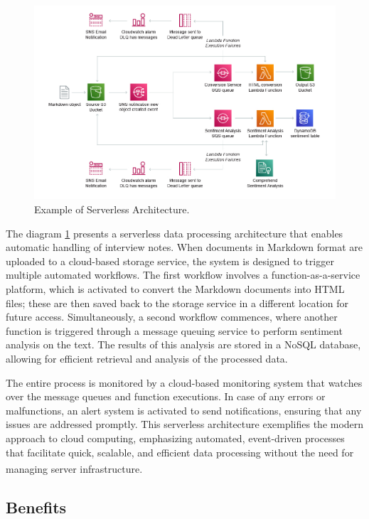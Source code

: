 \begin{figure}
    \centering
    \includegraphics[scale=0.4]{Pictures/3_serverless_example_2.jpg}
    \caption{Example of Serverless Architecture.}
    \label{fig:3_serverless_example}
\end{figure}

The diagram \ref{fig:3_serverless_example} presents a serverless data processing architecture that
enables automatic handling of interview notes. When documents in Markdown format are uploaded to a
cloud-based storage service, the system is designed to trigger multiple automated workflows. The
first workflow involves a function-as-a-service platform, which is activated to convert the Markdown
documents into HTML files; these are then saved back to the storage service in a different location
for future access. Simultaneously, a second workflow commences, where another function is triggered
through a message queuing service to perform sentiment analysis on the text. The results of this
analysis are stored in a NoSQL database, allowing for efficient retrieval and analysis of the
processed data.

The entire process is monitored by a cloud-based monitoring system that watches over the message
queues and function executions. In case of any errors or malfunctions, an alert system is activated
to send notifications, ensuring that any issues are addressed promptly. This serverless architecture
exemplifies the modern approach to cloud computing, emphasizing automated, event-driven processes
that facilitate quick, scalable, and efficient data processing without the need for managing server
infrastructure\textsuperscript{\cite{serverless_1}}.

\subsection{Benefits}

